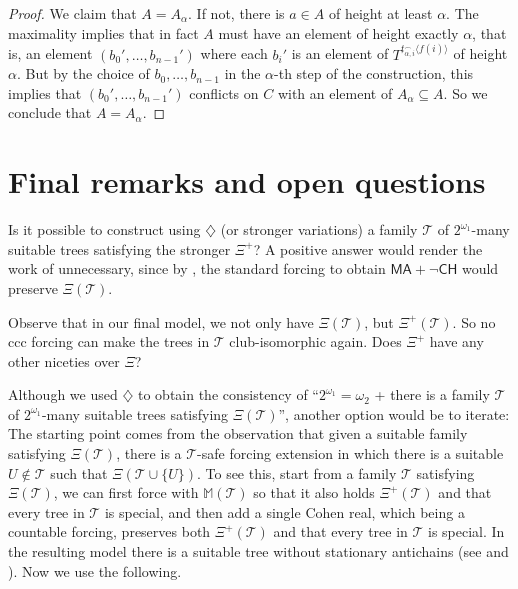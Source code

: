 \documentclass[10pt,a4paper]{amsart}
\theoremstyle{definition}
\newcommand{\seb}{\subseteq}
\newcommand{\tup}[1]{\langle#1\rangle}
\newcommand{\CH}{\textsf{CH}}
\newcommand{\MA}{\textsf{MA}}
\newcommand{\1}{\mathbf{1}}
\newcommand{\dia}{\diamondsuit}
\newcommand{\M}{\mathbb{M}}
\newcommand{\T}{\mathcal{T}}
\newcommand{\prop}{\Xi}
\newcommand{\propp}{\prop^{+}}
\begin{document}
\begin{proof}
  We claim that $A = A_{\alpha}$. If not, there is $a \in A$ of
  height at least $\alpha$. The maximality implies that in fact
  $A$ must have an element of height exactly $\alpha$,
  that is, an element $(b_{0}',\dots,b_{n-1}')$ where
  each $b_{i}'$ is an element of $T^{t_{\alpha,i}^{\frown}\tup{f(i)}}$
  of height $\alpha$. But 
  by the choice of $b_{0},\dots,b_{n-1}$ in
  the $\alpha$-th step of the construction, this implies that
  $(b_{0}',\dots,b_{n-1}')$ conflicts on $C$
  with an element of $A_{\alpha} \seb A$.
  So we conclude that $A = A_{\alpha}$.
\end{proof}


\section{Final remarks and open questions}

Is it possible to construct using $\dia$ (or stronger variations) a family
$\T$ of $2^{\omega_{1}}$-many suitable trees satisfying the stronger $\propp$?
A positive answer would render the work of 
unnecessary, since by , the standard forcing
to obtain $\MA + \neg \CH$ would preserve $\prop(\T)$.

Observe that in our final model, we not only have $\prop(\T)$, but
$\propp(\T)$. So no ccc forcing can make the trees in $\T$
club-isomorphic again. Does $\propp$ have any other niceties over $\prop$?

Although we used $\dia$ to obtain the consistency of
``$2^{\omega_{1}} = \omega_{2}$
+ there is a family $\T$ of $2^{\omega_{1}}$-many suitable trees
satisfying $\prop(\T)$'', another option would be to iterate: The
starting point comes from the observation that given a suitable family satisfying
$\prop(\T)$, there is a $\T$-safe forcing extension in which there
is a suitable $U \notin \T$ such that $\prop(\T \cup \{U\})$. To see this,
start from a family $\T$ satisfying $\prop(\T)$,
we can first force with $\M(\T)$ so that it also holds $\propp(\T)$ and
that every
tree in $\T$ is special, and then add a single Cohen real, which
being a countable forcing, preserves both $\propp(\T)$ and that every
tree in $\T$ is special. In the resulting
model there is a suitable tree without stationary antichains
(see \cite{TodorcevicWalks}
and \cite{HrusakMartinez}). Now we use the following.
 
\end{document}
